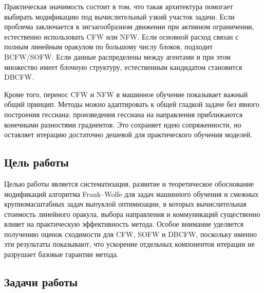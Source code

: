 Практическая значимость состоит в том, что такая архитектура помогает выбирать модификацию
под вычислительный узкий участок задачи.
Если проблема заключается в зигзагообразном движении при активном ограничении, естественно
использовать CFW или NFW.
Если основной расход связан с полным линейным оракулом по большому числу блоков, подходит
BCFW/SOFW.
Если данные распределены между агентами и при этом множество имеет блочную структуру,
естественным кандидатом становится DBCFW.

Кроме того, перенос CFW и NFW в машинное обучение показывает важный общий принцип.
Методы можно адаптировать к общей гладкой задаче без явного построения гессиана:
произведения гессиана на направления приближаются конечными разностями градиентов.
Это сохраняет идею сопряженности, но оставляет итерацию достаточно дешевой для практического
обучения моделей.

\subsection{Цель работы}

Целью работы является систематизация, развитие и теоретическое обоснование модификаций
алгоритма Frank--Wolfe для задач машинного обучения и смежных крупномасштабных задач
выпуклой оптимизации, в которых вычислительная стоимость линейного оракула, выбора
направления и коммуникаций существенно влияет на практическую эффективность метода.
Особое внимание уделяется получению оценок сходимости для CFW, SOFW и DBCFW, поскольку
именно эти результаты показывают, что ускорение отдельных компонентов итерации не разрушает
базовые гарантии метода.

\subsection{Задачи работы}

